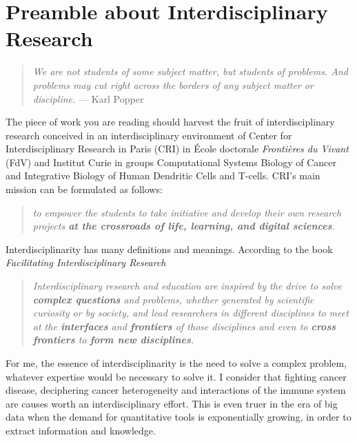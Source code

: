 \documentclass[12pt,]{book}
\theoremstyle{definition}
\theoremstyle{definition}
\theoremstyle{definition}
\theoremstyle{remark}
\begin{document}
\newpage\thispagestyle{empty}

\hypertarget{preamble-about-interdisciplinary-research}{%
\chapter*{Preamble about Interdisciplinary
Research}\label{preamble-about-interdisciplinary-research}}

\setcounter{page}{17}

\begin{quote}
\emph{We are not students of some subject matter, but students of
problems. And problems may cut right across the borders of any subject
matter or discipline.} --- Karl Popper
\end{quote}

The piece of work you are reading should harvest the fruit of
interdisciplinary research conceived in an interdisciplinary environment
of Center for Interdisciplinary Research in Paris (CRI) in École
doctorale \emph{Frontières du Vivant} (FdV) and Institut Curie in groups
Computational Systems Biology of Cancer and Integrative Biology of Human
Dendritic Cells and T-cells. CRI's main mission can be formulated as
follows:

\begin{quote}
\emph{to empower the students to take initiative and develop their own
research projects \textbf{at the crossroads of life, learning, and
digital sciences}.} \citep{CRIweb}
\end{quote}

Interdisciplinarity has many definitions and meanings. According to the
book \emph{Facilitating Interdisciplinary Research} \citep{FIRbook}

\begin{quote}
\emph{Interdisciplinary research and education are inspired by the drive
to solve \textbf{complex questions} and problems, whether generated by
scientific curiosity or by society, and lead researchers in different
disciplines to meet at the \textbf{interfaces} and \textbf{frontiers} of
those disciplines and even to \textbf{cross frontiers} to \textbf{form
new disciplines}.}
\end{quote}

For me, the essence of interdisciplinarity is the need to solve a
complex problem, whatever expertise would be necessary to solve it. I
consider that fighting cancer disease, deciphering cancer heterogeneity
and interactions of the immune system are causes worth an
interdisciplinary effort. This is even truer in the era of big data when
the demand for quantitative tools is exponentially growing, in order to
extract information and knowledge.
\end{document}
